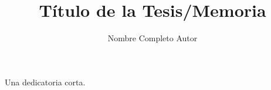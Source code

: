 \documentclass{tesisUOH}
\author{Nombre Completo Autor}
\title{\textbf{Título de la Tesis/Memoria}}
\begin{document}
\frontmatter
\maketitle

\begin{resumen}
\lipsum[1-4]
\end{resumen}


\begin{dedicatoria}
Una dedicatoria corta.
\end{dedicatoria}

\begin{thanks}
\lipsum[1-2]
\end{thanks}
{
\hypersetup{linkcolor=black}
\tableofcontents
\listoftables %
\listoffigures %
}

\pagestyle{fancy}
\fancyhead{} %
\fancyhead[C]{\nouppercase{\rightmark\hfill\leftmark}}
\fancyhead[C]{\nouppercase{\leftmark\hfill\rightmark}}
\fancyfoot{} %
\fancyfoot[C]{\thepage}

\mainmatter






% 
% 
% 
% 





\begin{appendices}

\end{appendices}
\end{document}
